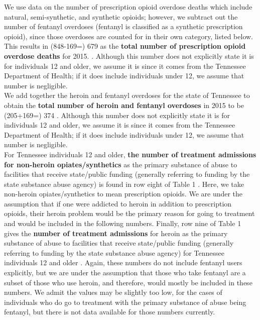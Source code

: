 \documentclass[12pt]{article}
\begin{document}

We use data on the number of prescription opioid overdose deaths which include natural, semi-synthetic, and synthetic opioids; however, we subtract out the number of fentanyl overdoses (fentanyl is classified as a synthetic prescription opioid), since those overdoses are counted for in their own category, listed below. This results in (848-169=) 679 as the \textbf{total number of prescription opioid overdose deaths} for 2015. \cite{PDO}. Although this number does not explicitly state it is for individuals 12 and older, we assume it is since it comes from the Tennessee Department of Health; if it does include individuals under 12, we assume that number is negligible. \\

We add together the heroin and fentanyl overdoses for the state of Tennessee to obtain the \textbf{total number of heroin and fentanyl overdoses} in 2015 to be (205+169=) 374 \cite{PDO}. Although this number does not explicitly state it is for individuals 12 and older, we assume it is since it comes from the Tennessee Department of Health; if it does include individuals under 12, we assume that number is negligible. \\

For Tennessee individuals 12 and older, \textbf{the number of treatment admissions for non-heroin opiates/synthetics} as the primary substance of abuse to facilities that receive state/public funding (generally referring to funding by the state substance abuse agency) is found in row eight of Table 1 \cite{TEDS2015_SAMSHA_admissions}. Here, we take non-heroin opiates/synthetics to mean prescription opioids. We are under the assumption that if one were addicted to heroin in addition to prescription opioids, their heroin problem would be the primary reason for going to treatment and would be included in the following numbers. Finally, row nine of Table 1 gives the \textbf{number of treatment admissions} for heroin as the primary substance of abuse to facilities that receive state/public funding (generally referring to funding by the state substance abuse agency) for Tennessee individuals 12 and older \cite{TEDS2015_SAMSHA_admissions}. Again, these numbers do not include fentanyl users explicitly, but we are under the assumption that those who take fentanyl are a subset of those who use heroin, and therefore, would mostly be included in these numbers. We admit the values may be slightly too low, for the cases of individuals who do go to treatment with the primary substance of abuse being fentanyl, but there is not data available for those numbers currently. 
\end{document}

